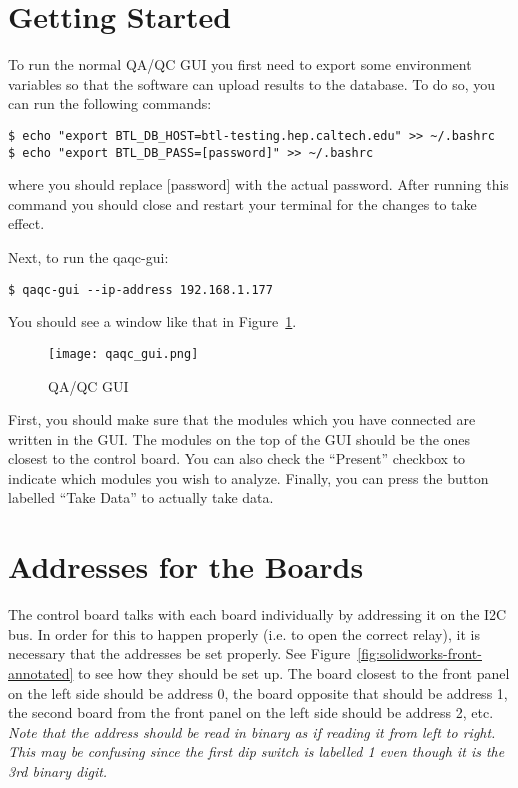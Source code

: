 \documentclass[12pt,openright,twoside]{report}
\begin{document}
\section{Getting Started}
To run the normal QA/QC GUI you first need to export some environment variables
so that the software can upload results to the database. To do so, you can run
the following commands:

\begin{mdframed}[backgroundcolor=light-gray, roundcorner=10pt,leftmargin=1, rightmargin=1, innerleftmargin=15, innertopmargin=15,innerbottommargin=15, outerlinewidth=1, linecolor=light-gray]
\begin{lstlisting}
$ echo "export BTL_DB_HOST=btl-testing.hep.caltech.edu" >> ~/.bashrc
$ echo "export BTL_DB_PASS=[password]" >> ~/.bashrc
\end{lstlisting}
\end{mdframed}

where you should replace [password] with the actual password. After running
this command you should close and restart your terminal for the changes to take
effect.

Next, to run the qaqc-gui:

\begin{mdframed}[backgroundcolor=light-gray, roundcorner=10pt,leftmargin=1, rightmargin=1, innerleftmargin=15, innertopmargin=15,innerbottommargin=15, outerlinewidth=1, linecolor=light-gray]
\begin{lstlisting}
$ qaqc-gui --ip-address 192.168.1.177
\end{lstlisting}
\end{mdframed}

You should see a window like that in Figure~\ref{fig:qaqc-gui}.

\begin{figure}
\centering
\texttt{[image: qaqc\_gui.png]}
\caption{QA/QC GUI}
\label{fig:qaqc-gui}
\end{figure}

First, you should make sure that the modules which you have connected are
written in the GUI. The modules on the top of the GUI should be the ones
closest to the control board. You can also check the ``Present'' checkbox to
indicate which modules you wish to analyze. Finally, you can press the button
labelled ``Take Data'' to actually take data.

\section{Addresses for the Boards}
The control board talks with each board individually by addressing it on the
I2C bus. In order for this to happen properly (i.e. to open the correct relay),
it is necessary that the addresses be set properly. See
Figure~\ref{fig:solidworks-front-annotated} to see how they should be set up.
The board closest to the front panel on the left side should be address 0, the
board opposite that should be address 1, the second board from the front panel
on the left side should be address 2, etc. \emph{Note that the address should
be read in binary as if reading it from left to right. This may be confusing
since the first dip switch is labelled 1 even though it is the 3rd binary
digit.}
\end{document}
